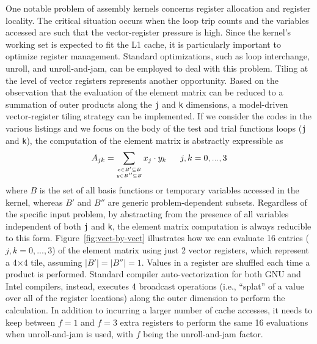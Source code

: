 One notable problem of assembly kernels concerns register allocation and register locality. The critical situation occurs when the loop trip counts and the variables accessed are such that the vector-register pressure is high. Since the kernel's working set is expected to fit the L1 cache, it is particularly important to optimize register management. Standard optimizations, such as loop interchange, unroll, and unroll-and-jam, can be employed to deal with this problem. Tiling at the level of vector registers represents another opportunity. Based on the observation that the evaluation of the element matrix can be reduced to a summation of outer products along the \texttt{j} and \texttt{k} dimensions, a model-driven vector-register tiling strategy can be implemented. If we consider the codes in the various listings and we focus on the body of the test and trial functions loops (\texttt{j} and \texttt{k}), the computation of the element matrix is abstractly expressible as
\begin{equation*}
\scriptsize
\label{outer-product}
A_{jk} = \sum_{\substack{
  x \in B' \subseteq B \\
  y \in B'' \subseteq B}}
x_j\cdot y_k ~~~~~~ j,k = 0,...,3
\end{equation*}
where $B$ is the set of all basis functions or temporary variables accessed in the kernel, whereas $B'$ and $B''$ are generic problem-dependent subsets. Regardless of the specific input problem, by abstracting from the presence of all variables independent of both \texttt{j} and \texttt{k}, the element matrix computation is always reducible to this form. Figure~\ref{fig:vect-by-vect} illustrates how we can evaluate 16 entries ($j,k=0,...,3$) of the element matrix using just 2 vector registers, which represent a 4$\times$4 tile, assuming $\vert B' \vert = \vert B'' \vert = 1$. Values in a register are shuffled each time a product is performed. Standard compiler auto-vectorization for both GNU and Intel compilers, instead, executes 4 broadcast operations (i.e., ``splat'' of a value over all of the register locations) along the outer dimension to perform the calculation. In addition to incurring a larger number of cache accesses, it needs to keep between $f=1$ and $f=3$ extra registers to perform the same 16 evaluations when unroll-and-jam is used, with $f$ being the unroll-and-jam factor.


